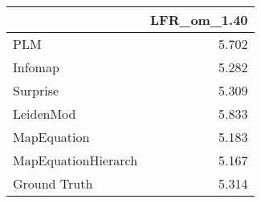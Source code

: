 \begin{tabular}{lr}
\toprule
{} & LFR_om_1.40 \\
\midrule
PLM                 &       5.702 \\
Infomap             &       5.282 \\
Surprise            &       5.309 \\
LeidenMod           &       5.833 \\
MapEquation         &       5.183 \\
MapEquationHierarch &       5.167 \\
Ground Truth        &       5.314 \\
\bottomrule
\end{tabular}
